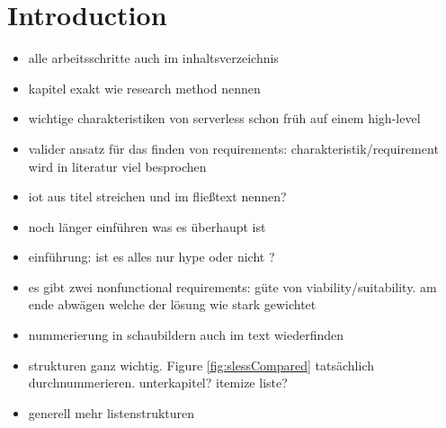 \chapter{Introduction}

\begin{itemize}
        
    \item alle arbeitsschritte auch im inhaltsverzeichnis  
    
    \item kapitel exakt wie research method nennen 
    
    \item wichtige charakteristiken von serverless schon früh auf einem high-level  
    
    \item valider ansatz für das finden von requirements: charakteristik/requirement wird in literatur viel besprochen
        
    \item iot aus titel streichen und im fließtext nennen?
    
    \item noch länger einführen was es überhaupt ist
    
    \item einführung: ist es alles nur hype oder nicht ?
    
    \item es gibt zwei nonfunctional requirements: güte von viability/suitability. 
    am ende abwägen welche der lösung wie stark gewichtet
    
    \item nummerierung in schaubildern auch im text wiederfinden
    
    \item strukturen ganz wichtig. Figure \ref{fig:slessCompared} tatsächlich durchnummerieren. unterkapitel? itemize liste?
    
    \item generell mehr listenstrukturen 
    
\end{itemize}



